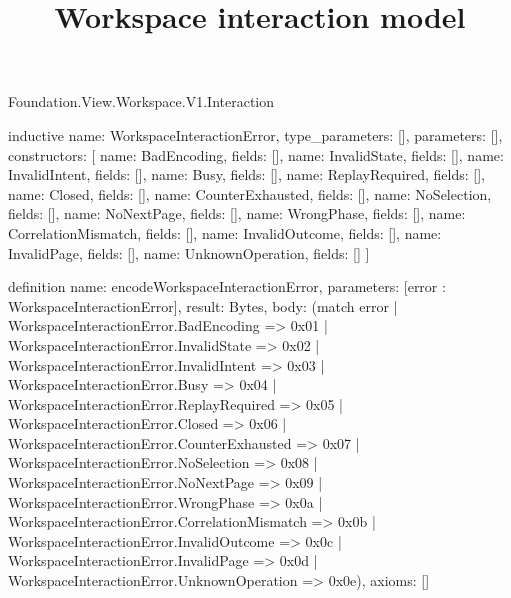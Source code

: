 \begin{lexlean}{Foundation.View.Workspace.V1.Interaction}
\title{Workspace interaction model}
\begin{semanticmodule}
inductive{
  name: WorkspaceInteractionError,
  type_parameters: [],
  parameters: [],
  constructors: [
    {name: BadEncoding, fields: []},
    {name: InvalidState, fields: []},
    {name: InvalidIntent, fields: []},
    {name: Busy, fields: []},
    {name: ReplayRequired, fields: []},
    {name: Closed, fields: []},
    {name: CounterExhausted, fields: []},
    {name: NoSelection, fields: []},
    {name: NoNextPage, fields: []},
    {name: WrongPhase, fields: []},
    {name: CorrelationMismatch, fields: []},
    {name: InvalidOutcome, fields: []},
    {name: InvalidPage, fields: []},
    {name: UnknownOperation, fields: []}
  ]
}

definition{
  name: encodeWorkspaceInteractionError,
  parameters: [error : WorkspaceInteractionError],
  result: Bytes,
  body: (match error
    | WorkspaceInteractionError.BadEncoding => 0x01
    | WorkspaceInteractionError.InvalidState => 0x02
    | WorkspaceInteractionError.InvalidIntent => 0x03
    | WorkspaceInteractionError.Busy => 0x04
    | WorkspaceInteractionError.ReplayRequired => 0x05
    | WorkspaceInteractionError.Closed => 0x06
    | WorkspaceInteractionError.CounterExhausted => 0x07
    | WorkspaceInteractionError.NoSelection => 0x08
    | WorkspaceInteractionError.NoNextPage => 0x09
    | WorkspaceInteractionError.WrongPhase => 0x0a
    | WorkspaceInteractionError.CorrelationMismatch => 0x0b
    | WorkspaceInteractionError.InvalidOutcome => 0x0c
    | WorkspaceInteractionError.InvalidPage => 0x0d
    | WorkspaceInteractionError.UnknownOperation => 0x0e),
  axioms: []
}


\end{semanticmodule}
\end{lexlean}
